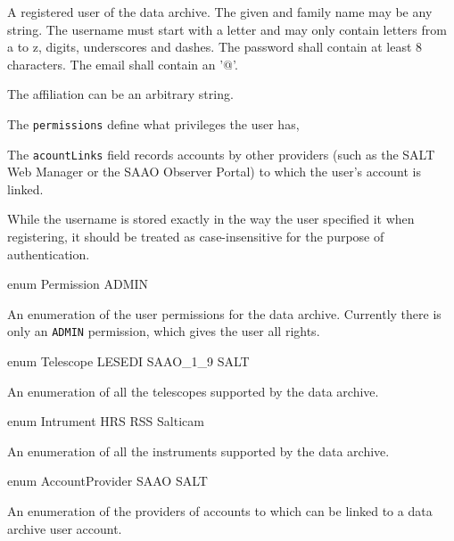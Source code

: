 A registered user of the data archive. The given and family name may be any string. The username must start with a letter and may only contain letters from a to z, digits, underscores and dashes. The password shall contain at least 8 characters. The email shall contain an '@'.

The affiliation can be an arbitrary string.

The \verb|permissions| define what privileges the user has,

The \verb|acountLinks| field records accounts by other providers (such as the \acrshort{SALT} Web Manager or the \acrshort{SAAO} Observer Portal) to which the user's account is linked.

\begin{note}
While the username is stored exactly in the way the user specified it when registering, it should be treated as case-insensitive for the purpose of authentication.
\end{note}


\begin{code}
enum Permission {
  ADMIN
}
\end{code}

An enumeration of the user permissions for the data archive. Currently there is only an \verb|ADMIN| permission, which gives the user all rights.


\begin{code}
enum Telescope {
  LESEDI
  SAAO_1_9
  SALT
}
\end{code}

An enumeration of all the telescopes supported by the data archive.


\begin{code}
enum Intrument {
  HRS
  RSS
  Salticam
}
\end{code}

An enumeration of all the instruments supported by the data archive.


\begin{code}
enum AccountProvider {
  SAAO
  SALT
}
\end{code}

An enumeration of the providers of accounts to which can be linked to a data archive user account.


